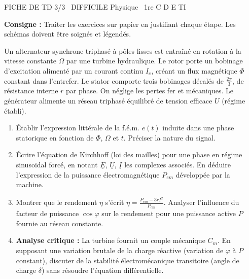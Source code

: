 \documentclass[11pt]{article}
\begin{document}
\begin{tcolorbox}[enhanced,colback=popink,colframe=popink,arc=10pt,boxrule=0pt,left=12pt,right=12pt,top=9pt,bottom=9pt]
{\color{white}\popxbold\small FICHE DE TD 3/3 \textbullet\ DIFFICILE \hfill Physique \textbullet\ 1re C D E TI\par}
\end{tcolorbox}
\vspace{4pt}
\noindent \textbf{Consigne :} Traiter les exercices sur papier en justifiant chaque étape. Les schémas doivent être soignés et légendés.

\begin{exercice}
Un alternateur synchrone triphasé à pôles lisses est entraîné en rotation à la vitesse constante $\Omega$ par une turbine hydraulique. Le rotor porte un bobinage d'excitation alimenté par un courant continu $I_e$, créant un flux magnétique $\Phi$ constant dans l'entrefer. Le stator comporte trois bobinages décalés de $\frac{2\pi}{3}$, de résistance interne $r$ par phase. On néglige les pertes fer et mécaniques. Le générateur alimente un réseau triphasé équilibré de tension efficace $U$ (régime établi).
\begin{enumerate}
    \item Établir l'expression littérale de la f.é.m. $e(t)$ induite dans une phase statorique en fonction de $\Phi$, $\Omega$ et $t$. Préciser la nature du signal.
    \item Écrire l'équation de Kirchhoff (loi des mailles) pour une phase en régime sinusoïdal forcé, en notant $\underline{E}$, $\underline{U}$, $\underline{I}$ les complexes associés. En déduire l'expression de la puissance électromagnétique $P_{em}$ développée par la machine.
    \item Montrer que le rendement $\eta$ s'écrit $\eta = \frac{P_{em} - 3rI^2}{P_{em}}$. Analyser l'influence du facteur de puissance $\cos\varphi$ sur le rendement pour une puissance active $P$ fournie au réseau constante.
    \item \textbf{Analyse critique :} La turbine fournit un couple mécanique $C_m$. En supposant une variation brutale de la charge réactive (variation de $\varphi$ à $P$ constant), discuter de la stabilité électromécanique transitoire (angle de charge $\delta$) sans résoudre l'équation différentielle.
\end{enumerate}
\end{exercice}
\end{document}
